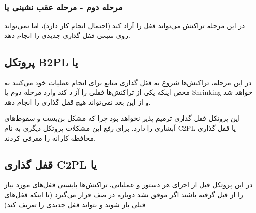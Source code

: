 \documentclass[a4paper]{article}
\begin{document}
\subsubsection*{مرحله دوم - مرحله عقب نشینی یا }

در این مرحله تراکنش می‌تواند قفل را آزاد کند (احتمال انجام کار دارد)، اما
نمی‌تواند روی منبعی قفل گذاری جدیدی را انجام دهد.

\newpage

\subsection{پروتکل B2PL یا }

در این مرحله، تراکنش‌ها شروع به قفل گذاری منابع برای انجام عملیات خود می‌کنند به
محض اینکه یکی از تراکنش‌ها قفلی را آزاد کند وارد مرحله دوم یا Shrinking خواهد شد
و از این بعد نمی‌تواند هیچ قفل گذاری را انجام دهد.


\begin{LTR}
    \begin{table}[h]
        \begin{RTL}
            \caption{زمانبندی $S_{6}$}
        \end{RTL}
        \centering
    \end{table}
\end{LTR}

این پروتکل قفل گذاری ترمیم پذیر نخواهد بود چرا که مشکل بن‌بست و سقوط‌های آبشاری
را دارد. برای رفع این مشکلات پروتکل دیگری به نام C2PL یا قفل گذاری محافظه کارانه
را معرفی کردند.

\subsection{قفل گذاری C2PL یا }

در این پروتکل قبل از اجرای هر دستور و عملیاتی، تراکنش‌ها بایستی قفل‌های مورد
نیاز را از قبل گرفته باشند اگر موفق نشد دوباره در صف قرار می‌گیرد (تا اینکه
قفل‌های قبلی باز شوند و بتواند قفل جدیدی را تعریف کند).
\end{document}
